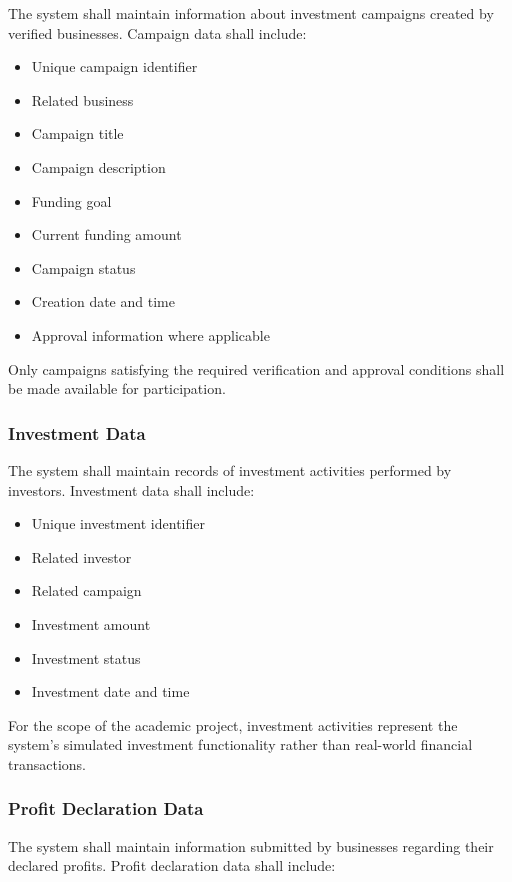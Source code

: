 The system shall maintain information about investment campaigns created
by verified businesses. Campaign data shall include:

\begin{itemize}
    \item Unique campaign identifier
    \item Related business
    \item Campaign title
    \item Campaign description
    \item Funding goal
    \item Current funding amount
    \item Campaign status
    \item Creation date and time
    \item Approval information where applicable
\end{itemize}

Only campaigns satisfying the required verification and approval
conditions shall be made available for participation.

\subsubsection{Investment Data}

The system shall maintain records of investment activities performed by
investors. Investment data shall include:

\begin{itemize}
    \item Unique investment identifier
    \item Related investor
    \item Related campaign
    \item Investment amount
    \item Investment status
    \item Investment date and time
\end{itemize}

For the scope of the academic project, investment activities represent
the system's simulated investment functionality rather than real-world
financial transactions.

\subsubsection{Profit Declaration Data}

The system shall maintain information submitted by businesses regarding
their declared profits. Profit declaration data shall include:

